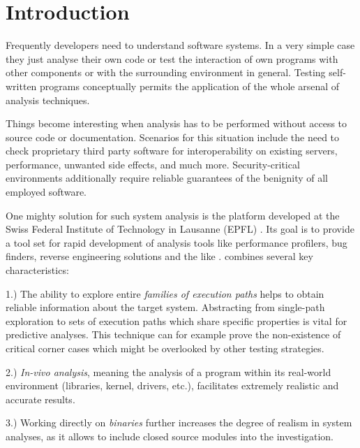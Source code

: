 \bigskip

\section{Introduction}


Frequently developers need to understand software systems.
In a very simple case they just analyse their own code or test the interaction of own programs with other components or with the surrounding environment in general.
Testing self-written programs conceptually permits the application of the whole arsenal of analysis techniques.


Things become interesting when analysis has to be performed without access to source code or documentation.
Scenarios for this situation include the need to check proprietary third party software for interoperability on existing servers, performance, unwanted side effects, and much more.
Security-critical environments additionally require reliable guarantees of the benignity of all employed software.


One mighty solution for such system analysis is the \sse platform developed at the Swiss Federal Institute of Technology in Lausanne (EPFL) \cite{chip11s2e}.
Its goal is to provide a tool set for rapid development of analysis tools like performance profilers, bug finders, reverse engineering solutions and the like \cite{chip12s2e}.
\sse combines several key characteristics:

1.) The ability to explore entire \textit{families of execution paths} helps to obtain reliable information about the target system.
Abstracting from single-path exploration to sets of execution paths which share specific properties is vital for predictive analyses.
This technique can for example prove the non-existence of critical corner cases which might be overlooked by other testing strategies.

2.) \textit{In-vivo analysis}, meaning the analysis of a program within its real-world environment (libraries, kernel, drivers, etc.), facilitates extremely realistic and accurate results.

3.) Working directly on \textit{binaries} further increases the degree of realism in system analyses, as it allows to include closed source modules into the investigation.

